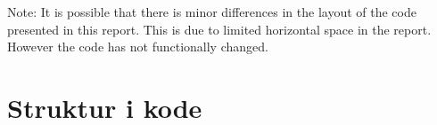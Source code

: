 \documentclass[11pt,a4paper,oneside]{report}
\begin{document}

\clearpage\maketitle
\thispagestyle{empty}

\clearpage\newpage
\thispagestyle{plain}



Note: It is possible that there is minor differences in the layout of the code presented in this report. This is due to limited horizontal space in the report. However the code has not functionally changed.

\section{Struktur i kode}
\end{document}

